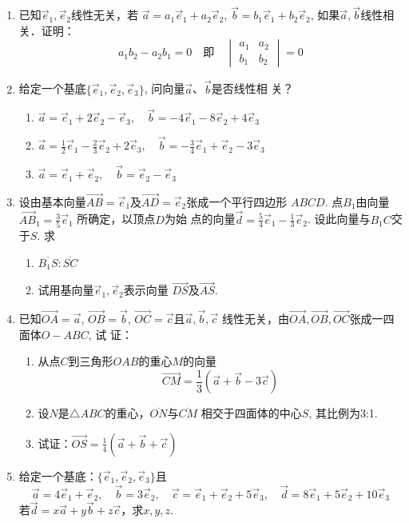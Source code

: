 \begin{ex}
\begin{enumerate}
    \item  已知$\vec{e}_1,\vec{e}_2$线性无关，若
    $\vec{a}=a_1\vec{e}_1+a_2\vec{e}_2$, $\vec{b}=b_1\vec{e}_1+b_2\vec{e}_2$,
    如果$\vec{a},\vec{b}$线性相关．证明：
   \[ a_1b_2-a_2b_1=0\quad \text{即}\quad \begin{vmatrix}
       a_1&a_2\\b_1&b_2
   \end{vmatrix}=0\]
\item 给定一个基底$\{\vec{e}_1,\vec{e}_2,\vec{e}_3\}$,
    问向量$\vec{a}$、$\vec{b}$是否线性相
    关？
\begin{enumerate}
    \item $\vec{a}=\vec{e}_1+2\vec{e}_2-\vec{e}_3,\quad \vec{b}=-4\vec{e}_1-8\vec{e}_2+4\vec{e}_3$
    \item $\vec{a}=\frac{1}{2}\vec{e}_1-\frac{2}{3}\vec{e}_2+2\vec{e}_3,\quad \vec{b}=-\frac{3}{4}\vec{e}_1+\vec{e}_2-3\vec{e}_3$
    \item $\vec{a}=\vec{e}_1+\vec{e}_2,\quad \vec{b}=\vec{e}_2-\vec{e}_3$
\end{enumerate}
\item 设由基本向量$\Vec{AB}=\vec{e}_1$及$\Vec{AD}=\vec{e}_2$张成一个平行四边形
    $ABCD$. 点$B_1$由向量
    $\Vec{AB}_1=\frac{3}{5}\vec{e}_1$
    所确定，以顶点$D$为始
    点的向量$\vec{d}=\frac{5}{4}\vec{e}_1-\frac{1}{3}\vec{e}_2$. 
    设此向量与$B_1C$交于$S$. 求
\begin{enumerate}
    \item $\overline{B_1S}:\overline{SC}$
    \item 试用基向量$\vec{e}_1,\vec{e}_2$表示向量
    $\Vec{DS}$及$\Vec{AS}$.
\end{enumerate}
\item 已知$\Vec{OA}=\vec{a}$, $\Vec{OB}=\vec{b}$, $\Vec{OC}=\vec{c}$且$\vec{a},\vec{b},\vec{c}$
    线性无关，由$\Vec{OA},\Vec{OB},\Vec{OC}$张成一四面体$O-ABC$, 试
    证：
\begin{enumerate}
    \item 从点$C$到三角形$OAB$的重心$M$的向量
    \[\Vec{CM}=\frac{1}{3}\left(\vec{a}+\vec{b}-3\vec{c}\right)\]
    \item 设$N$是$\triangle ABC$的重心，$\overline{ON}$与$\overline{CM}$ 相交于四面体的中心$S$, 其比例为3:1.
    \item 试证：$\Vec{OS}=\frac{1}{4}\left(\vec{a}+\vec{b}+\vec{c}\right)$
\end{enumerate}
    
\item 给定一个基底：$\{\vec{e}_1,\vec{e}_2,\vec{e}_3\}$且
\[\vec{a}=4\vec{e}_1+\vec{e}_2,\quad \vec{b}=3\vec{e}_2,\quad \vec{c}=\vec{e}_1+\vec{e}_2+5\vec{e}_3,\quad \vec{d}=8\vec{e}_1+5\vec{e}_2+10\vec{e}_3\]
若$\vec{d}=x\vec{a}+y\vec{b}+z\vec{c}$，求$x,y,z$.
\end{enumerate}
\end{ex}

